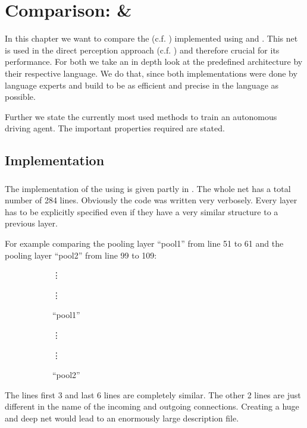 \chapter{Comparison: \cnnarch \& \caffe}

In this chapter we want to compare the \alexnet (c.f. ) implemented using \cnnarch and \caffe. This net is used in the direct perception approach (c.f. ) and therefore crucial for its performance. For both we take an in depth look at the predefined architecture by their respective language. We do that, since both implementations were done by language experts and build to be as efficient and precise in the language as possible.

Further we state the currently most used methods to train an autonomous driving agent. The important properties required are stated.

\section{Implementation} \label{sec: Implementation}

\subsection{\caffe} \label{subsec: Caffe Implementation}
The implementation of the \alexnet using \caffe is given partly in . The whole net has a total number of 284 lines. Obviously the code was written very verbosely. Every layer has to be explicitly specified even if they have a very similar structure to a previous layer.

For example comparing the pooling layer ``pool1'' from line 51 to 61 and the pooling layer ``pool2'' from line 99 to 109:
\begin{figure}[H]
	\centering
	\begin{subfigure}[b]{0.45\textwidth}
		\hspace*{2cm}\vdots
		
		\hspace*{2cm}\vdots
		\caption{``pool1''}
		\label{lst: pool1}
	\end{subfigure}
	\begin{subfigure}[b]{0.45\textwidth}
		\hspace*{2cm}\vdots
		
		\hspace*{2cm}\vdots
		\caption{``pool2''}
		\label{lst: pool2}
	\end{subfigure}
	\caption{}
	\label{lst: pool1 and pool2}
\end{figure}
The lines first 3 and last 6 lines are completely similar. The other 2 lines are just different in the name of the incoming and outgoing connections. Creating a huge and deep net would lead to an enormously large description file. 

